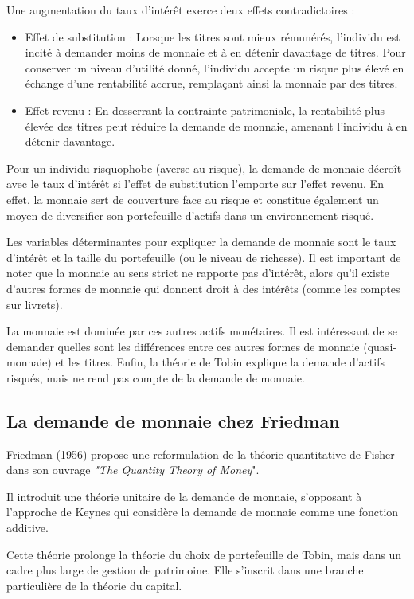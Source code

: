 \documentclass[a4paper, 12pt]{report}
\begin{document}
Une augmentation du taux d'intérêt exerce deux effets contradictoires :

\begin{itemize}
	\item Effet de substitution : Lorsque les titres sont mieux rémunérés, l'individu est incité à demander moins de monnaie et à en détenir davantage de titres. Pour conserver un niveau d'utilité donné, l'individu accepte un risque plus élevé en échange d'une rentabilité accrue, remplaçant ainsi la monnaie par des titres.
	\item Effet revenu : En desserrant la contrainte patrimoniale, la rentabilité plus élevée des titres peut réduire la demande de monnaie, amenant l'individu à en détenir davantage.
\end{itemize}

Pour un individu risquophobe (averse au risque), la demande de monnaie décroît avec le taux d'intérêt si l'effet de substitution l'emporte sur l'effet revenu. En effet, la monnaie sert de couverture face au risque et constitue également un moyen de diversifier son portefeuille d'actifs dans un environnement risqué.

Les variables déterminantes pour expliquer la demande de monnaie sont le taux d'intérêt et la taille du portefeuille (ou le niveau de richesse). Il est important de noter que la monnaie au sens strict ne rapporte pas d'intérêt, alors qu'il existe d'autres formes de monnaie qui donnent droit à des intérêts (comme les comptes sur livrets).

La monnaie est dominée par ces autres actifs monétaires. Il est intéressant de se demander quelles sont les différences entre ces autres formes de monnaie (quasi-monnaie) et les titres. Enfin, la théorie de Tobin explique la demande d'actifs risqués, mais ne rend pas compte de la demande de monnaie.
	
\subsection{La demande de monnaie chez Friedman}

Friedman (1956) propose une reformulation de la théorie quantitative de Fisher dans son ouvrage \textit{"The Quantity Theory of Money}". 

Il introduit une théorie unitaire de la demande de monnaie, s'opposant à l'approche de Keynes qui considère la demande de monnaie comme une fonction additive.

Cette théorie prolonge la théorie du choix de portefeuille de Tobin, mais dans un cadre plus large de gestion de patrimoine. Elle s'inscrit dans une branche particulière de la théorie du capital.
\end{document}
